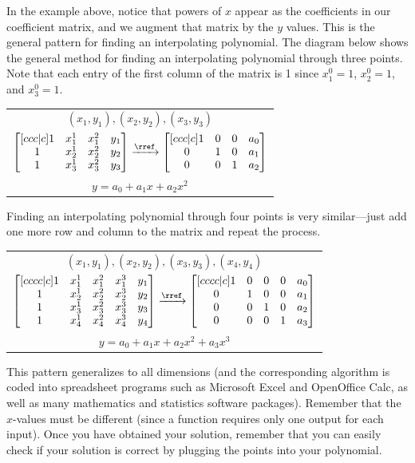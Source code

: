 In the example above, notice that powers of $x$ appear as the coefficients in our coefficient matrix, and we augment that matrix by the $y$ values. This is the general pattern for finding an interpolating polynomial. The diagram below shows the general method for finding an interpolating polynomial through three points.  Note that each entry of the first column of the matrix is 1 since $x_1^0=1$, $x_2^0=1$, and $x_3^0=1$.
\begin{center}
\begin{tabular}{c}
$(x_1,y_1),(x_2,y_2),(x_3,y_3)$ \\
 $
\begin{bmatrix}[ccc|c] 
1&x_1^1&x_1^2&y_1\\
1&x_2^1&x_2^2&y_2\\
1&x_3^1&x_3^2&y_3
\end {bmatrix}
\xrightarrow{\rref}
\begin{bmatrix}[ccc|c]
1&0&0&a_0\\
0&1&0&a_1\\
0&0&1&a_2
\end {bmatrix} 
$
\\
 $y=a_0+a_1x+a_2x^2$
\end{tabular}
\end{center}
Finding an interpolating polynomial through four points is very similar---just add one more row and column to the matrix and repeat the process.
\begin{center}
\begin{tabular}{c}
$(x_1,y_1),(x_2,y_2),(x_3,y_3),(x_4,y_4)$\\
$
\begin{bmatrix}[cccc|c] 
1&x_1^1&x_1^2&x_1^3&y_1\\
1&x_2^1&x_2^2&x_2^3&y_2\\
1&x_3^1&x_3^2&x_3^3&y_3\\
1&x_4^1&x_4^2&x_4^3&y_4
\end {bmatrix}
\xrightarrow{\rref}
\begin{bmatrix}[cccc|c]
1&0&0&0&a_0\\
0&1&0&0&a_1\\
0&0&1&0&a_2\\
0&0&0&1&a_3
\end {bmatrix} 
$\\
$y=a_0+a_1x+a_2x^2+a_3x^3$
\end{tabular}
\end{center}
This pattern generalizes to all dimensions (and the corresponding
algorithm is coded into spreadsheet programs such as Microsoft Excel
and OpenOffice Calc, as well as many mathematics and statistics
software packages). Remember that the $x$-values must be different
(since a function requires only one output for each input). Once you have obtained your solution, remember that you can easily check if your solution is correct by plugging the points into your polynomial.



